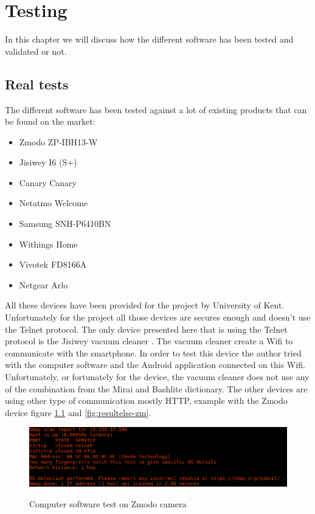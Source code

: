 \documentclass{report}
\begin{document}
\chapter{Testing}
In this chapter we will discuss how the different software has been tested and validated or not.

\section{Real tests}
The different software has been tested against a lot of existing products that can be found on the market:
\begin{itemize}
 \item Zmodo ZP-IBH13-W \autocite{zmodo}
 \item Jisiwey I6 (S+) \autocite{jisiwey}
 \item Canary Canary \autocite{canary}
 \item Netatmo Welcome \autocite{netatmo}
 \item Samsung SNH-P6410BN \autocite{samsung}
 \item Withings Home \autocite{withings}
 \item Vivotek FD8166A \autocite{vivotek}
 \item Netgear Arlo \autocite{netgear}
\end{itemize}
All these devices have been provided for the project by University of Kent. Unfortunately for the project all those devices are secures enough and doesn't use the Telnet protocol. The only device presented here that is using the Telnet protocol is the Jisiwey vacuum cleaner \autocite{jisiwey}.\newline
The vacuum cleaner create a Wifi to communicate with the smartphone. In order to test this device the author tried with the computer software and the Android application connected on this Wifi. Unfortunately, or fortunately for the device, the vacuum cleaner does not use any of the combination from the Mirai and Bashlite dictionary.\newline
The other devices are using other type of communication mostly HTTP, example with the Zmodo device figure \ref{fig:result-zm} and \ref{fig:resultelse-zm}.
\begin{figure}[h]
 \caption{Computer software test on Zmodo \protect\footnotemark camera}
 \centering
 \includegraphics[width=1.2\textwidth]{./img/exp/result}
 \label{fig:result-zm}
\end{figure}
\end{document}
